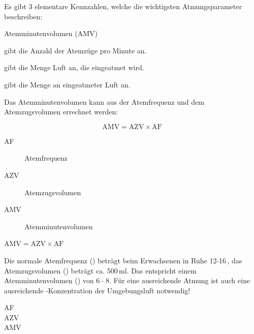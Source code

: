 {

Es gibt 3 elementare Kennzahlen, welche die wichtigsten Atmungsparameter
beschreiben:

\begin{labeling}[\dots{}]{Atemminutenvolumen (AMV)}
  \item[\T{Atemfrequenz} (\T{AF})] gibt die Anzahl der Atemzüge pro
  Minute an.
  \item[\T{Atemzugsvolumen} (\T{AZV})] gibt die Menge
  Luft an, die  eingeatmet wird.
  \item[\T{Atemminutenvolumen} (\T{AMV})] gibt die Menge an 
  eingeatmeter Luft an.
\end{labeling}

Das Atemminutenvolumen kann aus der Atemfrequenz und dem Atemzugsvolumen
errechnet werden: 

\begin{equation}
\mbox{AMV} = \mbox{AZV} \times \mbox{AF}
\end{equation}

}{
\begin{description}
    \item[AF] {\dotfill} Atemfrequenz
    \item[AZV] {\dotfill} Atemzugsvolumen
    \item[AMV] {\dotfill} Atemminutenvolumen
\end{description}

$\mbox{AMV} = \mbox{AZV} \times \mbox{AF}$
}{}{}{}



{
Die normale Atemfrequenz () beträgt beim Erwachsenen
in Ruhe 12-16\,, das Atemzugsvolumen
() beträgt ca. 500\,ml. Das
entspricht einem Atemminutenvolumen () von  6\,--\,8\LMin.  Für eine
ausreichende Atmung ist auch eine ausreichende -Konzentration der
Umgebungsluft notwendig! 
}{
\begin{description}
    \item[AF] {\dotfill} 
    \item[AZV] {\dotfill} 
    \item[AMV] {\dotfill} 
\end{description}
}{}{}{}

